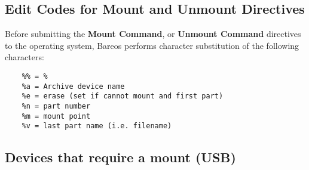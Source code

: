 \subsection{Edit Codes for Mount and Unmount Directives}
\label{mountcodes}

Before submitting the {\bf Mount Command}, or {\bf Unmount Command}
directives to the operating system, Bareos performs character substitution
of the following characters:

\footnotesize
\begin{verbatim}
    %% = %
    %a = Archive device name
    %e = erase (set if cannot mount and first part)
    %n = part number
    %m = mount point
    %v = last part name (i.e. filename)
\end{verbatim}
\normalsize

\subsection{Devices that require a mount (USB)}

